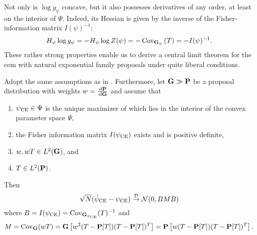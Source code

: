 Not only is $\log g_{\psi}$ concave, but it also possesses derivatives of any order, at least on the interior of $\Psi$. Indeed, its Hessian is given by the inverse of the Fisher-information matrix $I(\psi)^{-1}$:
$$
H_{\psi} \log g_{\psi} = - H_{\psi} \log Z (\psi) = - \cov_{\G_{\psi}} \left(T\right) = -I(\psi)^{-1}.
$$
These rather strong properties enable us to derive a central limit theorem for the \acrshort{cem} with natural exponential family proposals under quite liberal conditions.

\begin{theorem}
    \label{thm:cem-clt}
    Adopt the same assumptions as in . Furthermore, let $\G \gg \P$ be a proposal distribution with weights $w = \rnd{\P}{\G}$ and assume that
    \begin{enumerate}
        \item\label{it:pceinterior} $\pce \in \Psi$ is the unique maximizer of  which lies in the interior of the convex parameter space $\Psi$, 
        \item\label{it:FIMspd} the Fisher information matrix $I(\pce)$ exists and is positive definite,
        \item\label{it:wTinL2G} $w,wT \in L^{2}(\G)$, and 
        \item\label{it:TinL2P} $T\in L^{2}(\P)$.
    \end{enumerate}
    
    Then 
    $$
        \sqrt{N}(\hpce - \pce) \convD \Normal (0, BMB)
    $$
    where $B = I(\pce) = \cov_{\G_{\pce}} (T)^{-1}$ and $$M = \cov_{\G} (wT) = \G \left[w^{2} (T - \P[T])(T - \P[T])^{T}\right] = \P \left[ w (T - \P [T]) (T - \P [T])^{T} \right].$$
\end{theorem}

